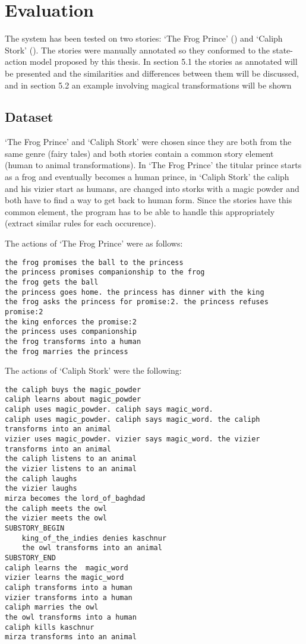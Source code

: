 \section{Evaluation}

The system has been tested on two stories: `The Frog Prince' (\cite{frogprince}) and
`Caliph Stork' (\cite{stork}). The stories were manually
annotated so they conformed to the state-action model proposed by this thesis.
In section 5.1 the stories as annotated will be presented and the similarities
and differences between them will be discussed, and in section 5.2 an example
involving magical transformations will be shown

\subsection{Dataset}

`The Frog Prince' and `Caliph Stork' were chosen since they are both from the same genre (fairy tales)
and both stories contain a common story element (human to animal transformations). In `The
Frog Prince' the titular prince starts as a frog and eventually becomes a human
prince, in `Caliph Stork' the caliph and his vizier start as humans, are changed
into storks with a magic powder and both have to find a way to get back to human
form. Since the stories have this common element, the program has to be able to
handle this appropriately (extract similar rules for each occurence).

The actions of `The Frog Prince' were as follows:
\begin{verbatim}
the frog promises the ball to the princess
the princess promises companionship to the frog
the frog gets the ball
the princess goes home. the princess has dinner with the king
the frog asks the princess for promise:2. the princess refuses promise:2
the king enforces the promise:2
the princess uses companionship
the frog transforms into a human
the frog marries the princess
\end{verbatim}

The actions of `Caliph Stork' were the following:
\begin{verbatim}
the caliph buys the magic_powder
caliph learns about magic_powder
caliph uses magic_powder. caliph says magic_word. 
caliph uses magic_powder. caliph says magic_word. the caliph transforms into an animal
vizier uses magic_powder. vizier says magic_word. the vizier transforms into an animal
the caliph listens to an animal
the vizier listens to an animal
the caliph laughs
the vizier laughs
mirza becomes the lord_of_baghdad
the caliph meets the owl
the vizier meets the owl
SUBSTORY_BEGIN
	king_of_the_indies denies kaschnur
	the owl transforms into an animal
SUBSTORY_END
caliph learns the  magic_word
vizier learns the magic_word
caliph transforms into a human
vizier transforms into a human
caliph marries the owl
the owl transforms into a human
caliph kills kaschnur
mirza transforms into an animal
\end{verbatim}

